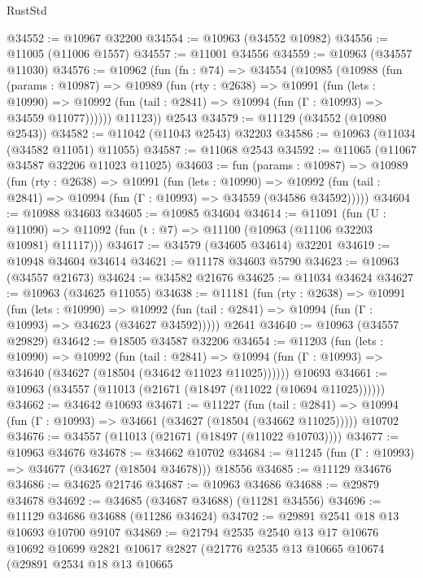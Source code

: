 \begin{lexlean}{RustStd}
\begin{coremodule}
@34552 := @10967 @32200
@34554 := @10963 (@34552 @10982)
@34556 := @11005 (@11006 @1557)
@34557 := @11001 @34556
@34559 := @10963 (@34557 @11030)
@34576 := @10962
    (fun (fn : @74) =>
    @34554
      (@10985
        (@10988
          (fun (params : @10987) =>
          @10989
            (fun (rty : @2638) =>
            @10991
              (fun (lets : @10990) =>
              @10992 (fun (tail : @2841) => @10994 (fun (Γ : @10993) => @34559 @11077))))))
        @11123))
    @2543
@34579 := @11129 (@34552 (@10980 @2543))
@34582 := @11042 (@11043 @2543) @32203
@34586 := @10963 (@11034 (@34582 @11051) @11055)
@34587 := @11068 @2543
@34592 := @11065 (@11067 @34587 @32206 @11023 @11025)
@34603 := fun (params : @10987) =>
  @10989
    (fun (rty : @2638) =>
    @10991
      (fun (lets : @10990) =>
      @10992 (fun (tail : @2841) => @10994 (fun (Γ : @10993) => @34559 (@34586 @34592)))))
@34604 := @10988 @34603
@34605 := @10985 @34604
@34614 := @11091
    (fun (U : @11090) => @11092 (fun (t : @7) => @11100 (@10963 (@11106 @32203 @10981) @11117)))
@34617 := @34579 (@34605 @34614) @32201
@34619 := @10948 @34604 @34614
@34621 := @11178 @34603 @5790
@34623 := @10963 (@34557 @21673)
@34624 := @34582 @21676
@34625 := @11034 @34624
@34627 := @10963 (@34625 @11055)
@34638 := @11181
    (fun (rty : @2638) =>
    @10991
      (fun (lets : @10990) =>
      @10992 (fun (tail : @2841) => @10994 (fun (Γ : @10993) => @34623 (@34627 @34592)))))
    @2641
@34640 := @10963 (@34557 @29829)
@34642 := @18505 @34587 @32206
@34654 := @11203
    (fun (lets : @10990) =>
    @10992
      (fun (tail : @2841) =>
      @10994 (fun (Γ : @10993) => @34640 (@34627 (@18504 (@34642 @11023 @11025))))))
    @10693
@34661 := @10963 (@34557 (@11013 (@21671 (@18497 (@11022 (@10694 @11025))))))
@34662 := @34642 @10693
@34671 := @11227
    (fun (tail : @2841) => @10994 (fun (Γ : @10993) => @34661 (@34627 (@18504 (@34662 @11025)))))
    @10702
@34676 := @34557 (@11013 (@21671 (@18497 (@11022 @10703))))
@34677 := @10963 @34676
@34678 := @34662 @10702
@34684 := @11245 (fun (Γ : @10993) => @34677 (@34627 (@18504 @34678))) @18556
@34685 := @11129 @34676
@34686 := @34625 @21746
@34687 := @10963 @34686
@34688 := @29879 @34678
@34692 := @34685 (@34687 @34688) (@11281 @34556)
@34696 := @11129 @34686 @34688 (@11286 @34624)
@34702 := @29891 @2541 @18 @13 @10693 @10700 @9107
@34869 := @21794
    @2535
    @2540
    @13
    @17
    @10676
    @10692
    @10699
    @2821
    @10617
    @2827
    (@21776
      @2535
      @13
      @10665
      @10674
      (@29891
        @2534
        @18
        @13
        @10665

\end{coremodule}
\end{lexlean}
